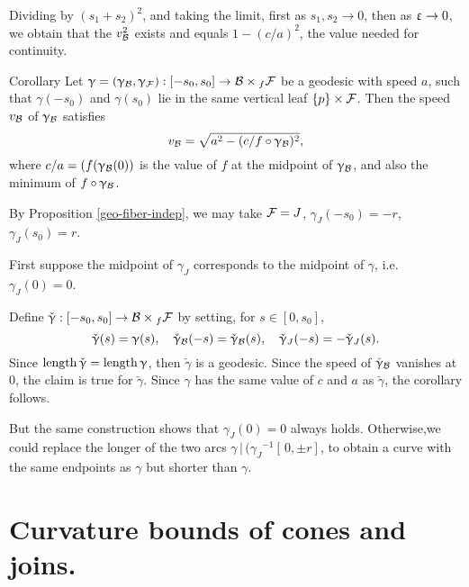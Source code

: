 Dividing by $(s_1+s_2)^2$, and taking the limit, first as
$s_1, s_2 \to 0$, then as $\eps \to 0$, we obtain that the $v_{\mathcal{B}}^2$ exists and  equals $1- (c/a)^2$,  the value needed
for continuity.
\qeds

\begin{thm}{Corollary}
\label{cor:vertical}
Let $\gamma=(\gamma_\spc{B},\gamma_\spc{F}):[-s_0,s_0]\to \spc{B}\times_f\spc{F}$ be a geodesic with speed $a$, such that  $\gamma(-s_0)$ and $\gamma(s_0)$ lie in the
same vertical leaf $\{p\}\times \spc{F}$.
Then the speed $v_{\mathcal{B}}$ of  $\upgamma_{\mathcal{B}}$ satisfies
$$v_\spc{B} = \sqrt{a^2-(c/f\circ\gamma_\spc{B})^2},$$
where $c/a=(f(\upgamma_{\mathcal{B}}(0))$ is the value of
$f$ at the midpoint of $\upgamma_{\mathcal{B}}$, and also the minimum of $f\circ\gamma_\spc{B}$.
\end{thm}

By Proposition \ref{geo-fiber-indep}, 
we may take $\mathcal{F}=J$, $\gamma_J(-s_0)= -r$,  $\gamma_J(s_0)=r$.  

First suppose the midpoint of $\gamma_J$ corresponds to the midpoint of $\gamma$, i.e. $\gamma_J(0)=0$. 

Define $\check\gamma: [-s_0,s_0]\to \spc{B}\times_f\spc{F}$  by setting, for $s\in[0,s_0]$, 
$$\check\gamma(s)=\gamma(s),\ \ \ \check\gamma_\spc{B}(-s)=\check\gamma_\spc{B}(s),\ \ \ \check\gamma_J(-s)=-\check\gamma_J(s).$$
Since $\mathop{\rm length}\nolimits\check{\upgamma} = \mathop{\rm length}\nolimits \upgamma$, then $\check\gamma$ is a geodesic.  Since the speed of $\check{\upgamma}_{\mathcal{B}}$ vanishes at $0$, the claim is true for $\check\gamma$.  Since $\gamma$ has the same value of $c$ and $a$ as $\check\gamma$, the corollary follows.

But the same construction shows that $\gamma_J(0)=0$ always holds. Otherwise,we could replace the longer of the two arcs $\gamma\,|\,({\gamma_J}^{-1}[\,0,\pm r]$, to obtain a curve with the same endpoints as $\gamma$
but shorter than $\gamma$.
\qeds




\section{Curvature bounds of cones and joins.}\label{sec:cones-joins}



